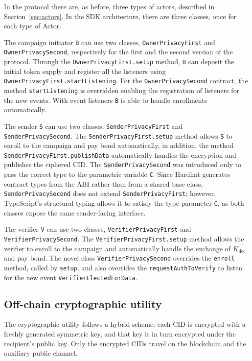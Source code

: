 In the protocol there are, as before, three types of actors, described in Section~\ref{sec:actors}.
In the SDK architecture, there are three classes, once for each type of Actor.

The campaign initiator \texttt{B} can use two classes, \texttt{OwnerPrivacyFirst} and \texttt{OwnerPrivacySecond}, respectively for the first and the second version of the protocol.
Through the \lstinline{OwnerPrivacyFirst.setup} method, \texttt{B} can deposit the initial token supply and register all the listeners using \lstinline{OwnerPrivacyFirst.startListening}.
For the \texttt{OwnerPrivacySecond} contract, the method \lstinline{startListening} is overridden enabling the registration of listeners for the new events.
With event listeners \texttt{B} is able to handle enrollments automatically.

The sender \texttt{S} can use two classes, \texttt{SenderPrivacyFirst} and \texttt{SenderPrivacySecond}.
The \lstinline{SenderPrivacyFirst.setup} method allows \texttt{S} to enroll to the campaign and pay bond automatically, in addition, the method \lstinline{SenderPrivacyFirst.publishData} automatically handles the encryption and publishes the ciphered CID.
The \texttt{SenderPrivacySecond} was introduced only to pass the correct type to the parametric variable \texttt{C}.
Since Hardhat generates contract types from the ABI rather than from a shared base class, \texttt{SenderPrivacySecond} does not extend \texttt{SenderPrivacyFirst}; however, TypeScript's structural typing allows it to satisfy the type parameter \texttt{C}, as both classes expose the same sender-facing interface.

The verifier \texttt{V} can use two classes, \texttt{VerifierPrivacyFirst} and \texttt{VerifierPrivacySecond}.
The \lstinline{VerifierPrivacyFirst.setup} method allows the verifier to enroll to the campaign and automatically handle the exchange of $K_{\text{dec}}$ and pay bond.
The novel class \texttt{VerifierPrivacySecond} overrides the \lstinline{enroll} method, called by \lstinline{setup}, and also overrides the \lstinline{requestAuthToVerify} to listen for the new event \texttt{VerifierElectedForData}.

\subsection{Off-chain cryptographic utility}\label{subsec:implementation-offchain-encryptions}
The cryptographic utility follows a hybrid scheme: each CID is encrypted with a freshly generated symmetric key, and that key is in turn encrypted under the recipient's public key.
Only the encrypted CIDs travel on the blockchain and the auxiliary public channel.

